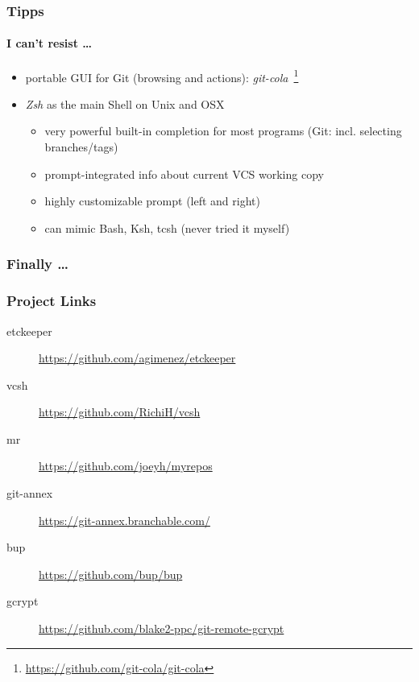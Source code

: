 \documentclass[english,hyperref={pdfpagelabels=false},aspectratio=169]{beamer}
\begin{document}
\begin{frame}[label=tipps]
  \frametitle{Tipps}
  \framesubtitle{I can't resist \dots}
  \begin{itemize}
    \item portable GUI for Git {\scriptsize\color{fzjgray50}(browsing and actions)}: \textit{git-cola}~\footnote{\tiny\url{https://github.com/git-cola/git-cola}}
    \item \emph{Zsh} as the main Shell on Unix and OSX
      \begin{itemize}
        \item very powerful built-in completion for most programs {\scriptsize\color{fzjgray50}(Git: incl. selecting branches/tags)}
        \item prompt-integrated info about current VCS working copy
        \item highly customizable prompt {\scriptsize\color{fzjgray50}(left and right)}
        \item can mimic Bash, Ksh, tcsh {\scriptsize\color{fzjgray50}(never tried it myself)}
      \end{itemize}
  \end{itemize}
\end{frame}

\begin{frame}
  \frametitle{Finally \dots}
  \huge
  \begin{center}
  \end{center}
\end{frame}


\begin{frame}
  \frametitle{Project Links}
  \begin{description}
    \item[etckeeper] \url{https://github.com/agimenez/etckeeper}
    \item[vcsh] \url{https://github.com/RichiH/vcsh}
    \item[mr] \url{https://github.com/joeyh/myrepos}
    \item[git-annex] \url{https://git-annex.branchable.com/}
    \item[bup] \url{https://github.com/bup/bup}
    \item[gcrypt] \url{https://github.com/blake2-ppc/git-remote-gcrypt}
  \end{description}
\end{frame}
\end{document}

